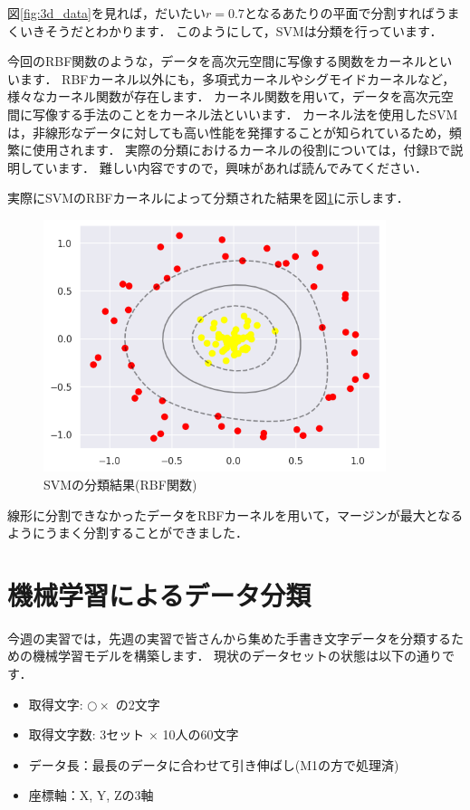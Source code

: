 \documentclass{jarticle}
\begin{document}
図\ref{fig:3d_data}を見れば，だいたい$r=0.7$となるあたりの平面で分割すればうまくいきそうだとわかります．
このようにして，SVMは分類を行っています．

今回のRBF関数のような，データを高次元空間に写像する関数をカーネルといいます．
RBFカーネル以外にも，多項式カーネルやシグモイドカーネルなど，様々なカーネル関数が存在します．
カーネル関数を用いて，データを高次元空間に写像する手法のことをカーネル法といいます．
カーネル法を使用したSVMは，非線形なデータに対しても高い性能を発揮することが知られているため，頻繁に使用されます．
実際の分類におけるカーネルの役割については，付録Bで説明しています．
難しい内容ですので，興味があれば読んでみてください．

実際にSVMのRBFカーネルによって分類された結果を図\ref{fig:svm_RBF}に示します．

\begin{figure}[H]
  \centering
  \includegraphics[width=10cm]{fig/svm_rbf_db.png}
  \caption{SVMの分類結果(RBF関数)}
  \label{fig:svm_RBF}
\end{figure}

線形に分割できなかったデータをRBFカーネルを用いて，マージンが最大となるようにうまく分割することができました．

\section{機械学習によるデータ分類}
今週の実習では，先週の実習で皆さんから集めた手書き文字データを分類するための機械学習モデルを構築します．
現状のデータセットの状態は以下の通りです．

\begin{itemize}
  \item 取得文字: $ \bigcirc  \times $ の2文字
  \item 取得文字数: 3セット $ \times $ 10人の60文字
  \item データ長：最長のデータに合わせて引き伸ばし(M1の方で処理済)
  \item 座標軸：X, Y, Zの3軸
\end{itemize}
\end{document}
